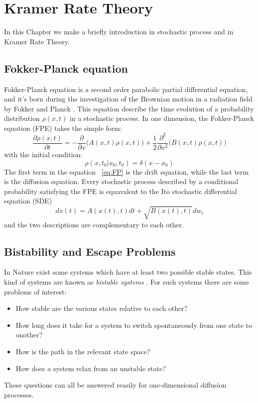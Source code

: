 
\chapter{Kramer Rate Theory}\label{kramer}
\lhead[\fancyplain{}{\bfseries\thepage}]{\fancyplain{}{\bfseries\rightmark}}
In this Chapter we make a briefly introduction in stochastic process and in Kramer Rate Theory.
\section{Fokker-Planck equation}
Fokker-Planck equation is a second order parabolic partial differential equation, and it's born during the investigation of the Brownian motion in a radiation field by Fokker and Planck \cite{K50}. This equation describe the time evolution of a probability distribution $\rho(x,t)$ in a stochastic process.
In one dimension, the Fokker-Planck equation (FPE) takes the simple form:
\begin{equation}
\frac{\partial \rho(x,t)}{\partial t} = -\frac{\partial}{\partial x} \biggl(A(x,t) \rho(x,t)\biggr) + \frac{1}{2} \frac{\partial ^2}{\partial x^2} \biggl(B(x,t) \rho(x,t) \biggr)
\label{eq:FP}
\end{equation}
with the initial condition:
\begin{equation}
\rho(x,t_0|x_0,t_0) = \delta(x-x_0)
\end{equation}
The first term in the equation ~\ref{eq:FP} is the drift equation, while the last term is the diffusion equation.
Every stochastic process described by a conditional probability satisfying the FPE is equavalent to the Ito stochastic differential equation (SDE)
\begin{equation}
dx(t) = A(x(t),t)dt + \sqrt{B(x(t),t)} dw_t
\end{equation}
and the two descriptions are complementary to each other.


\section{Bistability and Escape Problems}
In Nature exist some systems which have at least two possible stable states. This kind of systems are known as \emph{bistable systems} \cite{K50}. For such systems there are some problems of interest:
\begin{itemize}
\item How stable are the various states relative to each other?
\item How long does it take for a system to switch spontaneously from one state to onother?
\item How is the path in the relevant state space?
\item How does a system relax from an unstable state?
\end{itemize}
These questions can all be answered reasily for one-dimensional diffusion processes.
